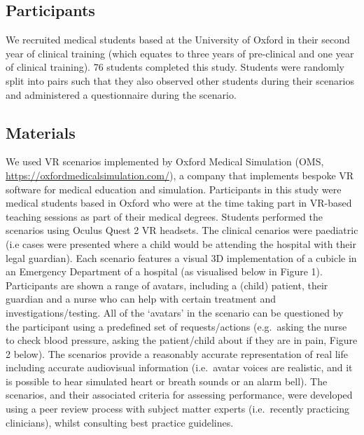 \documentclass[a4paper, nobind]{templates/ociamthesis}
\begin{document}
\subsection*{Participants}\label{participants-2}

We recruited medical students based at the University of Oxford in their second year of clinical training (which equates to three years of pre-clinical and one year of clinical training). 76 students completed this study. Students were randomly split into pairs such that they also observed other students during their scenarios and administered a questionnaire during the scenario.

\subsection*{Materials}\label{materials-2}

We used VR scenarios implemented by Oxford Medical Simulation (OMS, \url{https://oxfordmedicalsimulation.com/}), a company that implements bespoke VR software for medical education and simulation. Participants in this study were medical students based in Oxford who were at the time taking part in VR-based teaching sessions as part of their medical degrees. Students performed the scenarios using Oculus Quest 2 VR headsets. The clinical cenarios were paediatric (i.e cases were presented where a child would be attending the hospital with their legal guardian). Each scenario features a visual 3D implementation of a cubicle in an Emergency Department of a hospital (as visualised below in Figure 1). Participants are shown a range of avatars, including a (child) patient, their guardian and a nurse who can help with certain treatment and investigations/testing. All of the `avatars' in the scenario can be questioned by the participant using a predefined set of requests/actions (e.g.~asking the nurse to check blood pressure, asking the patient/child about if they are in pain, Figure 2 below). The scenarios provide a reasonably accurate representation of real life including accurate audiovisual information (i.e.~avatar voices are realistic, and it is possible to hear simulated heart or breath sounds or an alarm bell). The scenarios, and their associated criteria for assessing performance, were developed using a peer review process with subject matter experts (i.e.~recently practicing clinicians), whilst consulting best practice guidelines.
\end{document}
